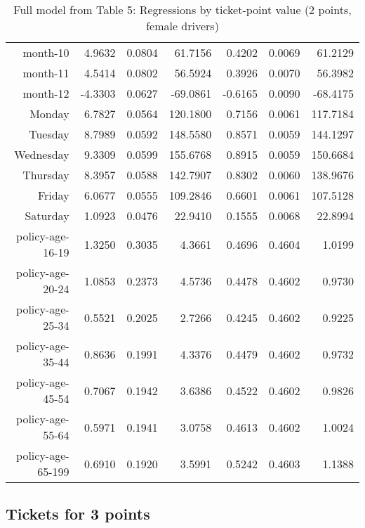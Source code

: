 \documentclass[10pt]{article}
\begin{document}
\begin{table}[ht]
\begin{tabular}{rrrrrrr}
  month-10 & 4.9632 & 0.0804 & 61.7156 & 0.4202 & 0.0069 & 61.2129 \\ 
  month-11 & 4.5414 & 0.0802 & 56.5924 & 0.3926 & 0.0070 & 56.3982 \\ 
  month-12 & -4.3303 & 0.0627 & -69.0861 & -0.6165 & 0.0090 & -68.4175 \\ 
  Monday & 6.7827 & 0.0564 & 120.1800 & 0.7156 & 0.0061 & 117.7184 \\ 
  Tuesday & 8.7989 & 0.0592 & 148.5580 & 0.8571 & 0.0059 & 144.1297 \\ 
  Wednesday & 9.3309 & 0.0599 & 155.6768 & 0.8915 & 0.0059 & 150.6684 \\ 
  Thursday & 8.3957 & 0.0588 & 142.7907 & 0.8302 & 0.0060 & 138.9676 \\ 
  Friday & 6.0677 & 0.0555 & 109.2846 & 0.6601 & 0.0061 & 107.5128 \\ 
  Saturday & 1.0923 & 0.0476 & 22.9410 & 0.1555 & 0.0068 & 22.8994 \\ 
  policy-age-16-19 & 1.3250 & 0.3035 & 4.3661 & 0.4696 & 0.4604 & 1.0199 \\ 
  policy-age-20-24 & 1.0853 & 0.2373 & 4.5736 & 0.4478 & 0.4602 & 0.9730 \\ 
  policy-age-25-34 & 0.5521 & 0.2025 & 2.7266 & 0.4245 & 0.4602 & 0.9225 \\ 
  policy-age-35-44 & 0.8636 & 0.1991 & 4.3376 & 0.4479 & 0.4602 & 0.9732 \\ 
  policy-age-45-54 & 0.7067 & 0.1942 & 3.6386 & 0.4522 & 0.4602 & 0.9826 \\ 
  policy-age-55-64 & 0.5971 & 0.1941 & 3.0758 & 0.4613 & 0.4602 & 1.0024 \\ 
  policy-age-65-199 & 0.6910 & 0.1920 & 3.5991 & 0.5242 & 0.4603 & 1.1388 \\ 
   \hline
\end{tabular}
\caption{Full model from Table 5: Regressions by ticket-point value (2 points, female drivers)} 
\label{tab_5_2_pts_F}
\end{table}


\clearpage
\pagebreak




\subsection*{Tickets for 3 points}



\end{document}
